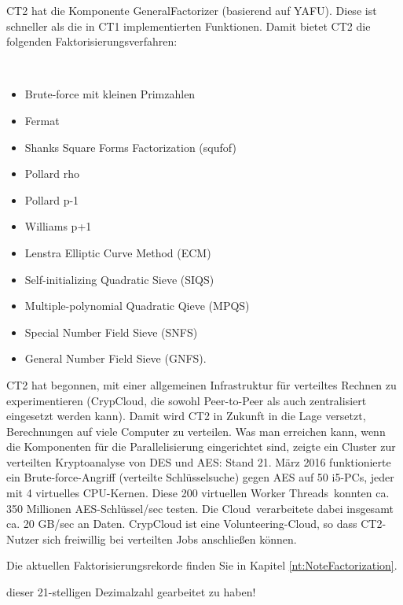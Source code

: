 \begin{refsegment}
{   CT2 hat die Komponente GeneralFactorizer
  (basierend auf YAFU). Diese ist schneller als die in CT1
  implementierten Funktionen.
  Damit bietet CT2 die folgenden Faktorisierungsverfahren:
\strut\\[-1.5\baselineskip]
\begin{multicols}{2}
  \begin{itemize}[nosep,label=-]
   \item Brute-force mit kleinen Primzahlen
   \item Fermat
   \item Shanks Square Forms Factorization (squfof)
   \item Pollard rho
   \item Pollard p-1
   \item Williams p+1
   \item Lenstra Elliptic Curve Method (ECM)
   \item Self-initializing Quadratic Sieve (SIQS)
   \item Multiple-polynomial Quadratic Qieve (MPQS)
   \item Special Number Field Sieve (SNFS)
   \item General Number Field Sieve (GNFS).
  \end{itemize}
\end{multicols}

   CT2 hat begonnen, mit einer allgemeinen Infrastruktur für verteiltes
  Rechnen zu experimentieren (CrypCloud, die sowohl Peer-to-Peer
  als auch zentralisiert eingesetzt werden kann). Damit wird CT2 in Zukunft in die
  Lage versetzt, Berechnungen auf viele Computer zu verteilen.
  Was man erreichen kann, wenn die Komponenten für die Parallelisierung eingerichtet
  sind, zeigte ein Cluster zur verteilten Kryptoanalyse von DES und AES:
  Stand 21. März 2016 funktionierte ein Brute-force-Angriff (verteilte Schlüsselsuche)
  gegen AES auf 50 i5-PCs, jeder mit 4 virtuelles CPU-Kernen. Diese 200 virtuellen
  \glqq Worker Threads\grqq~konnten ca. 350 Millionen AES-Schlüssel/sec testen. Die
  \glqq Cloud\grqq~verarbeitete dabei insgesamt ca. 20 GB/sec an Daten. CrypCloud
  ist eine Volunteering-Cloud, so dass CT2-Nutzer sich freiwillig bei
  verteilten Jobs anschließen können.

   Die aktuellen Faktorisierungsrekorde finden Sie in Kapitel
  \ref{nt:NoteFactorization}.
}
dieser 21-stelligen Dezimalzahl gearbeitet zu haben!


\end{refsegment}
